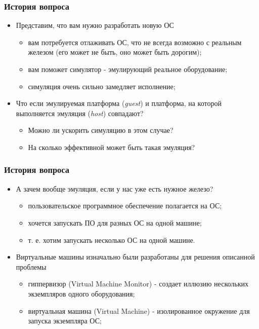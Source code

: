 \begin{frame}
\frametitle{История вопроса}
\begin{itemize}
  \item<1-> Представим, что вам нужно разработать новую ОС
    \begin{itemize}
      \item вам потребуется отлаживать ОС, что не всегда возможно с
            реальным железом (его может не быть, оно может быть дорогим);
      \item вам поможет симулятор - эмулирующий реальное оборудование;
      \item симуляция очень сильно замедляет исполнение;
    \end{itemize}
  \item<2-> Что если эмулируемая платформа (\emph{guest}) и платформа, на
        которой выполняется эмуляция (\emph{host}) совпадают?
    \begin{itemize}
      \item Можно ли ускорить симуляцию в этом случае?
      \item На сколько эффективной может быть такая эмуляция?
    \end{itemize}
\end{itemize}
\end{frame}

\begin{frame}
\frametitle{История вопроса}
\begin{itemize}
  \item<1-> А зачем вообще эмуляция, если у нас уже есть нужное железо?
    \begin{itemize}
      \item пользовательское программное обеспечение полагается на ОС;
      \item хочется запускать ПО для разных ОС на одной машине;
      \item т. е. хотим запускать несколько ОС на одной машине.
    \end{itemize}
  \item<2-> Виртуальные машины изначально были разработаны для решения описанной
        проблемы
    \begin{itemize}
      \item гиппервизор (Virtual Machine Monitor) - создает иллюзию нескольких
            экземпляров одного оборудования;
      \item виртуальная машина (Virtual Machine) - изолированное окружение для
            запуска экземпляра ОС;
    \end{itemize}
\end{itemize}
\end{frame}

